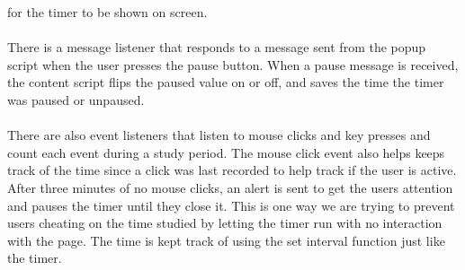 \documentclass[12pt]{article}
\begin{document}
for the timer to be shown on screen. \\\\
\indent There is a message listener that responds to a message sent from the popup script
when the user presses the pause button. When a pause message is received, the content script flips the paused value on or off, and saves the time the timer was paused or unpaused.\\\\
\indent There are also event listeners that listen to mouse clicks and key presses and count each event during a study period. The mouse click event also helps keeps track of the time since a click 
was last recorded to help track if the user is active. After three minutes of no mouse clicks, an alert is sent to get the users attention and pauses the timer until they close it. This is one way we 
are trying to prevent users cheating on the time studied by letting the timer run with no interaction with the page. The time is kept track of using the set interval function just like the timer. \\
\end{document}
